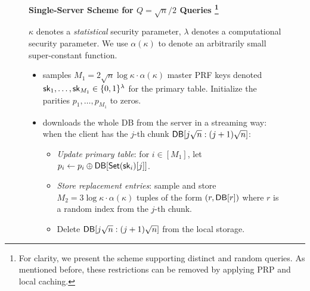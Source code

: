\begin{figure}[p]
    \begin{minipage}{\textwidth}
        \begin{mdframed}
            \label{alg:fullpolyl}
            \begin{center}
                {\bf Single-Server Scheme for $Q=\sqrt{n}/2$ Queries
                    \footnote{For clarity, we present the scheme supporting distinct and random queries. As mentioned before, these restrictions can be removed by applying PRP and local caching.}
                }
            \end{center}
            $\kappa$ denotes a {\it statistical} security parameter, $\lambda$
            denotes a computational security parameter. We use $\alpha(\kappa)$
            to denote an arbitrarily small super-constant function.

            \begin{itemize}[leftmargin=3mm,itemsep=1pt]
                \item 
                \Client samples $M_1=2\sqrt{n}\log \kappa \cdot \alpha(\kappa)$
                master PRF keys denoted ${\sf sk}_1, \dots, {\sf sk}_{M_1} \in \{0,
                1\}^\lambda$ for the primary table.
                Initialize the parities $p_1,\dots,p_{M_1}$ to zeros.
                
                
                \item 
                \Client downloads the whole DB from the server in a streaming
                way: when the client has the $j$-th chunk
                $\mathsf{DB}[j\sqrt{n}:(j+1)\sqrt{n}]$:
                \begin{itemize}
                    \item {\it Update primary table}: for $i \in [M_1]$, let
                    $p_i \leftarrow p_i \oplus \mathsf{DB}[\mathsf{Set}({\sf sk}_i)[j]]$.
                    \item {\it Store replacement entries}: sample and store
                    $M_2=3\log \kappa \cdot \alpha(\kappa)$ %
                    tuples of the form $(r, \mathsf{DB}[r])$ where $r$ is a random index
                    from the $j$-th chunk.
                    \item Delete $\mathsf{DB}[j \sqrt{n}:(j +1)\sqrt{n}]$ from the local
                    storage.
                \end{itemize}
                

\end{itemize}
\end{mdframed}
\end{minipage}
\end{figure}
